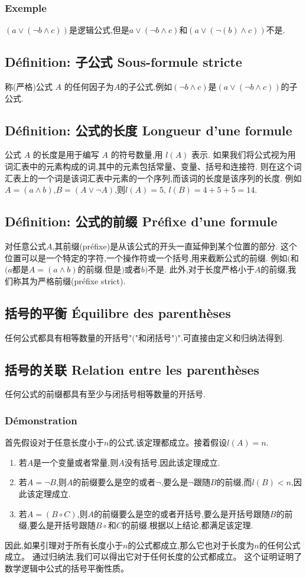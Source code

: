 \documentclass[12pt, a4paper, oneside]{ctexbook}
\begin{document}
  \subsubsection{Exemple}
  $(a\lor(\lnot b\land c))$是逻辑公式,但是$a\lor(\lnot b\land c)$和$(a\lor(\lnot( b)\land c))$不是.
  \subsection{Définition: 子公式 Sous-formule stricte}
  称(严格)公式 $A$ 的任何因子为$A$的子公式.例如$(\lnot b\land c)$是$(a\lor(\lnot b\land c))$的子公式.
  \subsection{Définition: 公式的长度 Longueur d'une formule}
  公式 $A$ 的长度是用于编写 $A$ 的符号数量,用 $l(A)$ 表示.
  如果我们将公式视为用词汇表中的元素构成的词,其中的元素包括常量、变量、括号和连接符.
  则在这个词汇表上的一个词是该词汇表中元素的一个序列,而该词的长度是该序列的长度.
  例如$A=(a\land b)$,$B=(A\lor \lnot A)$,则$l(A)=5,\,l(B)=4+5+5=14$.
  \subsection{Définition: 公式的前缀 Préfixe d'une formule}
  对任意公式$A$,其前缀(préfixe)是从该公式的开头一直延伸到某个位置的部分.
  这个位置可以是一个特定的字符,一个操作符或一个括号,用来截断公式的前缀.
  例如$($和$(a$都是$A=(a\land b)$的前缀.但是$)$或者$b)$不是.
  此外,对于长度严格小于$A$的前缀,我们称其为严格前缀(préfixe strict).
  \subsection{括号的平衡  Équilibre des parenthèses}
  任何公式都具有相等数量的开括号"$($"和闭括号"$)$".可直接由定义和归纳法得到.
  \subsection{括号的关联 Relation entre les parenthèses}
  任何公式的前缀都具有至少与闭括号相等数量的开括号.
  \subsubsection{Démonstration}
  首先假设对于任意长度小于$n$的公式,该定理都成立。接着假设$l(A)=n$.
  \begin{enumerate}
    \item 若$A$是一个变量或者常量,则$A$没有括号,因此该定理成立.
    \item 若$A=\lnot B$,则$A$的前缀要么是空的或者$\lnot$,要么是$\lnot$跟随$B$的前缀,而$l(B)<n$,因此该定理成立.
    \item 若$A=(B\circ C)$,则$A$的前缀要么是空的或者开括号,要么是开括号跟随$B$的前缀,要么是开括号跟随$B\circ$和$C$的前缀.根据以上结论,都满足该定理.
  \end{enumerate}
  因此,如果引理对于所有长度小于$n$的公式都成立,那么它也对于长度为$n$的任何公式成立。
  通过归纳法,我们可以得出它对于任何长度的公式都成立。
  这个证明证明了数学逻辑中公式的括号平衡性质。
\end{document}
